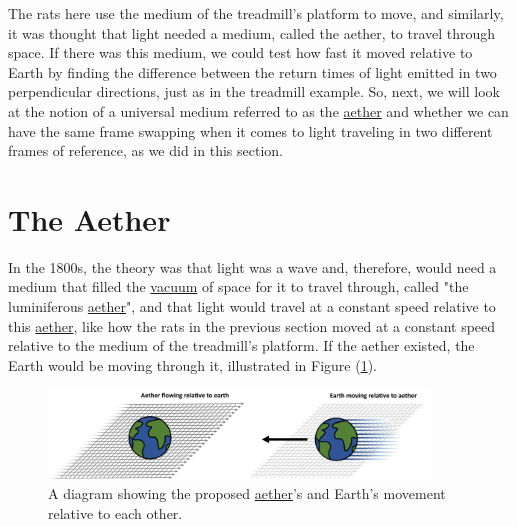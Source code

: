 The rats here use the medium of the treadmill's platform to move, and similarly, it was thought that light needed a medium, called the aether, to travel through space.
If there was this medium, we could test how fast it moved relative to Earth by finding the difference between the return times of light emitted in two perpendicular directions, just as in the treadmill example.
So, next, we will look at the notion of a universal medium referred to as the \hyperlink{def-aether}{aether} and whether we can have the same frame swapping when it comes to light traveling in two different frames of reference, as we did in this section.

\section{The Aether} \label{sect: The Aether}

In the 1800s, the theory was that light was a wave and, therefore, would need a medium that filled the \hyperlink{def-vacuum}{vacuum} of space for it to travel through, called "the luminiferous \hyperlink{def-aether}{aether}", and that light would travel at a constant speed relative to this \hyperlink{def-aether}{aether}, like how the rats in the previous section moved at a constant speed relative to the medium of the treadmill's platform.
If the aether existed, the Earth would be moving through it, illustrated in Figure (\ref{fig: Aether}).

\begin{figure}[ht]
	\centering
	\includegraphics[width = 0.9\textwidth]{images/pdf/earth_and_aether.pdf}
	\caption{A diagram showing the proposed \protect\hyperlink{def-aether}{aether}'s and Earth's movement relative to each other.}
	\label{fig: Aether}
\end{figure}

